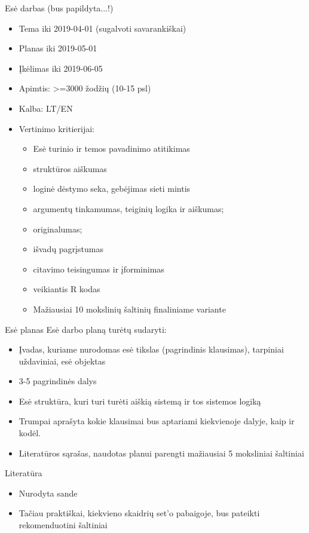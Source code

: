 \documentclass[11pt,xcolor=table]{beamer}
\begin{document}
\begin{frame}{Esė darbas (bus papildyta...!) }
\begin{itemize}
\item Tema iki 2019-04-01 (sugalvoti savarankiškai)
\item Planas iki 2019-05-01
\item Įkėlimas iki 2019-06-05
\item Apimtis: >=3000 žodžių (10-15 psl)
\item Kalba: LT/EN
\item Vertinimo kritierijai:
\begin{itemize}
\item Esė turinio ir temos pavadinimo atitikimas
\item struktūros aiškumas
\item loginė dėstymo seka, gebėjimas sieti mintis
\item argumentų tinkamumas, teiginių logika ir aiškumas;
\item originalumas;
\item išvadų pagrįstumas
\item citavimo teisingumas ir įforminimas
\item veikiantis R kodas
\item Mažiausiai 10 mokslinių šaltinių finaliniame variante
\end{itemize}
\end{itemize}
\end{frame}

\begin{frame}{Esė planas}
Esė darbo planą turėtų sudaryti:
\begin{itemize}
\item Įvadas, kuriame nurodomas esė tikslas (pagrindinis klausimas), tarpiniai uždaviniai, esė objektas
\item 3-5 pagrindinės dalys
\item Esė struktūra, kuri turi turėti aiškią sistemą ir tos sistemos logiką
\item Trumpai aprašyta kokie klausimai bus aptariami kiekvienoje dalyje, kaip ir kodėl.
\item Literatūros sąrašas, naudotas planui parengti mažiausiai 5 moksliniai šaltiniai
\end{itemize}
\end{frame}


\begin{frame}{Literatūra}
\begin{itemize}
\item Nurodyta sande
\item Tačiau praktiškai, kiekvieno skaidrių set'o pabaigoje, bus pateikti rekomenduotini šaltiniai
\end{itemize}
\end{frame}
\end{document}
